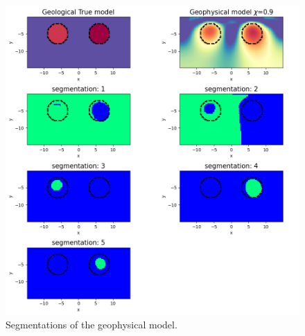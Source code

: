 \begin{figure}[htb]
    \vspace{-0.1cm}
    \begin{center}
    \includegraphics[width=\columnwidth]{figures/geosegments.png}
    \end{center}
    \vspace{-0.5cm}
\caption{
    Segmentations of the geophysical model.
}
\label{fig:data-normalizations}
\vspace{-0.1cm}
\end{figure}